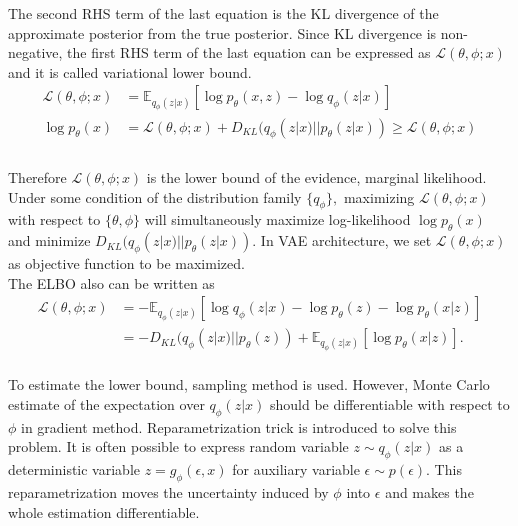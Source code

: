 \documentclass[10pt]{article}
\begin{document}
The second RHS term of the last equation is the KL divergence of the approximate posterior from the true posterior. Since KL divergence is non-negative, the first RHS term of the last equation can be expressed as $\mathcal{L}(\theta, \phi; x)$ and it is called variational lower bound.
\begin{equation*}
	\begin{aligned}
	\mathcal{L}(\theta, \phi; x) &= \mathbb{E}_{q_{\phi}(z|x)}\left[ \log{p_{\theta}(x, z)} - \log{q_{\phi}(z|x)} \right] \\
	\log{p_{\theta}(x)} &= \mathcal{L}(\theta, \phi; x) + D_{KL}( q_{\phi}(z|x) || p_{\theta}(z|x)) \geq \mathcal{L}(\theta, \phi ; x) \\
	\end{aligned}
\end{equation*}
\\
Therefore $\mathcal{L}(\theta, \phi; x)$ is the lower bound of the evidence, marginal likelihood. Under some condition of the distribution family $\{ q_{\phi} \}, $ maximizing $\mathcal{L}(\theta, \phi; x)$ with respect to $\{ \theta, \phi \}$ will simultaneously maximize log-likelihood $\log{p_{\theta}(x)}$ and minimize $ D_{KL}( q_{\phi}(z|x) || p_{\theta}(z|x))$. In VAE architecture, we set $\mathcal{L}(\theta, \phi; x)$ as objective function to be maximized.\\

The ELBO also can be written as 
\begin{equation*}
	\begin{aligned}
		\mathcal{L}(\theta, \phi ; x) &= -\mathbb{E}_{q_{\phi}(z|x)}\left[ \log{q_{\phi}(z|x)} - \log{p_{\theta}(z)} - \log{p_{\theta}(x|z)}  \right] \\
		&= -D_{KL}( q_{\phi}(z|x) || p_{\theta}(z)) + \mathbb{E}_{q_{\phi}(z|x)}\left[ \log{p_{\theta}(x|z)}  \right]. \\
	\end{aligned}
\end{equation*}

To estimate the lower bound, sampling method is used. However, Monte Carlo estimate of the expectation over $q_{\phi}(z|x)$ should be differentiable with respect to $\phi$ in gradient method. Reparametrization trick is introduced to solve this problem. It is often possible to express random variable $z \sim q_{\phi}(z|x) $ as a deterministic variable $z = g_{\phi}(\epsilon, x)$ for auxiliary variable $\epsilon \sim p(\epsilon)$. This reparametrization moves the uncertainty induced by $\phi$ into $\epsilon$ and makes the whole estimation differentiable.
\end{document}
